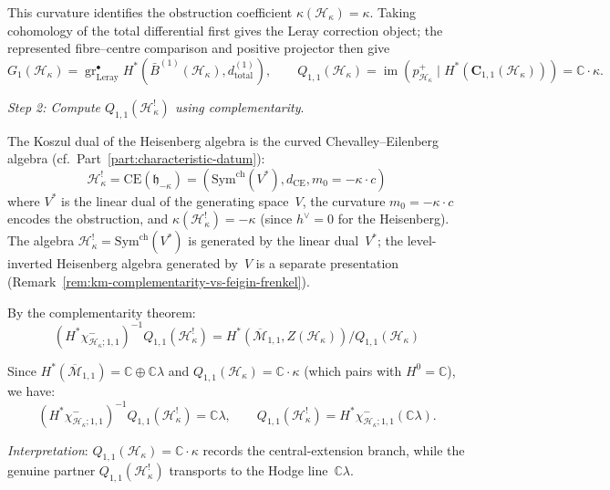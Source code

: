 \begin{example}
This curvature identifies the obstruction coefficient
$\kappa(\mathcal{H}_\kappa) = \kappa$.
Taking cohomology of the total differential first gives the Leray
correction object; the represented fibre--centre comparison and
positive projector then give
\begin{equation}
G_1(\mathcal H_\kappa)
=\operatorname{gr}^{\bullet}_{\mathrm{Leray}}
H^*(\bar B^{(1)}(\mathcal H_\kappa),d^{(1)}_{\mathrm{total}}),
\qquad
Q_{1,1}(\mathcal H_\kappa)
=\operatorname{im}\!\left(
p^+_{\mathcal H_\kappa}\mid H^*(\mathbf C_{1,1}(\mathcal H_\kappa))
\right)
=\mathbb C\cdot\kappa.
\end{equation}

\emph{Step 2: Compute $Q_{1,1}(\mathcal{H}_\kappa^!)$ using complementarity}.

The Koszul dual of the Heisenberg algebra is the curved Chevalley--Eilenberg algebra (cf.\ Part~\ref{part:characteristic-datum}):
\begin{equation}
\mathcal{H}_\kappa^! = \mathrm{CE}(\mathfrak{h}_{-\kappa}) = (\mathrm{Sym}^{\mathrm{ch}}(V^*), d_{\mathrm{CE}}, m_0 = -\kappa \cdot c)
\end{equation}
where $V^*$ is the linear dual of the generating space~$V$, the curvature
$m_0 = -\kappa \cdot c$ encodes the obstruction, and
$\kappa(\mathcal{H}_\kappa^!) = -\kappa$
(since $h^\vee = 0$ for the Heisenberg).
The algebra $\mathcal{H}_\kappa^!=\mathrm{Sym}^{\mathrm{ch}}(V^*)$
is generated by the linear dual~$V^*$; the level-inverted Heisenberg
algebra generated by~$V$ is a separate presentation
\textup{(}Remark~\textup{\ref{rem:km-complementarity-vs-feigin-frenkel})}.

By the complementarity theorem:
\begin{equation}
(H^*\chi^-_{\mathcal H_\kappa;1,1})^{-1}
Q_{1,1}(\mathcal{H}_\kappa^!)
=H^*(\overline{\mathcal{M}}_{1,1},Z(\mathcal{H}_\kappa))
/Q_{1,1}(\mathcal{H}_\kappa)
\end{equation}

Since $H^*(\overline{\mathcal{M}}_{1,1}) = \mathbb{C} \oplus \mathbb{C}\lambda$ and
$Q_{1,1}(\mathcal{H}_\kappa) = \mathbb{C} \cdot \kappa$ (which pairs with $H^0 = \mathbb{C}$),
we have:
\begin{equation}
(H^*\chi^-_{\mathcal H_\kappa;1,1})^{-1}
Q_{1,1}(\mathcal{H}_\kappa^!)=\mathbb C\lambda,
\qquad
Q_{1,1}(\mathcal H_\kappa^!)
=H^*\chi^-_{\mathcal H_\kappa;1,1}(\mathbb C\lambda).
\end{equation}

\emph{Interpretation}: $Q_{1,1}(\mathcal{H}_\kappa)=
\mathbb C\cdot\kappa$ records the central-extension branch, while the
genuine partner $Q_{1,1}(\mathcal H_\kappa^!)$ transports to the Hodge
line~$\mathbb C\lambda$.


\end{example}

